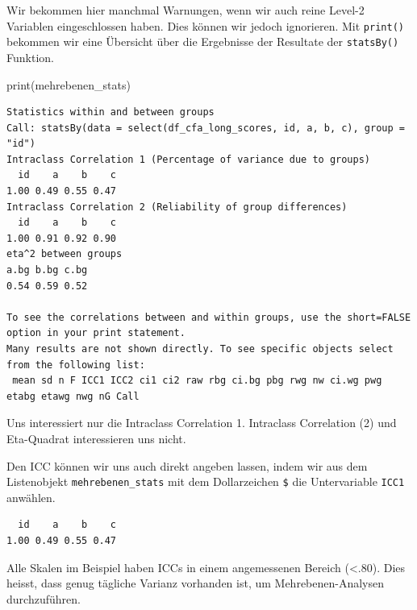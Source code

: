 \documentclass[
  letterpaper,
  DIV=11,
  numbers=noendperiod]{scrreprt}
\newenvironment{Shaded}{\begin{snugshade}}{\end{snugshade}}
\newcommand{\CommentTok}[1]{\textcolor[rgb]{0.37,0.37,0.37}{#1}}
\newcommand{\DecValTok}[1]{\textcolor[rgb]{0.68,0.00,0.00}{#1}}
\newcommand{\FunctionTok}[1]{\textcolor[rgb]{0.28,0.35,0.67}{#1}}
\newcommand{\NormalTok}[1]{\textcolor[rgb]{0.00,0.23,0.31}{#1}}
\newcommand{\OtherTok}[1]{\textcolor[rgb]{0.00,0.23,0.31}{#1}}
\newcommand{\SpecialCharTok}[1]{\textcolor[rgb]{0.37,0.37,0.37}{#1}}
\begin{document}
Wir bekommen hier manchmal Warnungen, wenn wir auch reine Level-2
Variablen eingeschlossen haben. Dies können wir jedoch ignorieren. Mit
\texttt{print()} bekommen wir eine Übersicht über die Ergebnisse der
Resultate der \texttt{statsBy()} Funktion.

\begin{Shaded}
\begin{Highlighting}[]
\FunctionTok{print}\NormalTok{(mehrebenen\_stats)}
\end{Highlighting}
\end{Shaded}

\begin{verbatim}
Statistics within and between groups  
Call: statsBy(data = select(df_cfa_long_scores, id, a, b, c), group = "id")
Intraclass Correlation 1 (Percentage of variance due to groups) 
  id    a    b    c 
1.00 0.49 0.55 0.47 
Intraclass Correlation 2 (Reliability of group differences) 
  id    a    b    c 
1.00 0.91 0.92 0.90 
eta^2 between groups  
a.bg b.bg c.bg 
0.54 0.59 0.52 

To see the correlations between and within groups, use the short=FALSE option in your print statement.
Many results are not shown directly. To see specific objects select from the following list:
 mean sd n F ICC1 ICC2 ci1 ci2 raw rbg ci.bg pbg rwg nw ci.wg pwg etabg etawg nwg nG Call
\end{verbatim}

Uns interessiert nur die Intraclass Correlation 1. Intraclass
Correlation (2) und Eta-Quadrat interessieren uns nicht.

Den ICC können wir uns auch direkt angeben lassen, indem wir aus dem
Listenobjekt \texttt{mehrebenen\_stats} mit dem Dollarzeichen
\texttt{\$} die Untervariable \texttt{ICC1} anwählen.

\begin{Shaded}
\end{Shaded}

\begin{verbatim}
  id    a    b    c 
1.00 0.49 0.55 0.47 
\end{verbatim}

Alle Skalen im Beispiel haben ICCs in einem angemessenen Bereich
(\textless.80). Dies heisst, dass genug tägliche Varianz vorhanden ist,
um Mehrebenen-Analysen durchzuführen.
\end{document}
